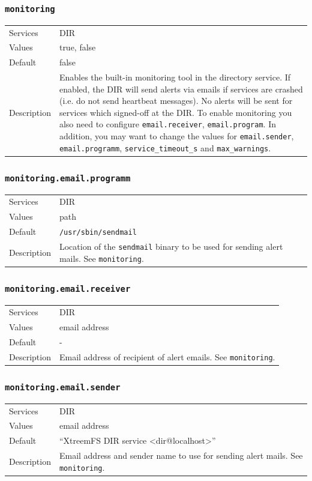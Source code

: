 \documentclass[a4paper,10pt]{book}
\begin{document}
\subsubsection{\texttt{monitoring}}
\begin{tabular}{lp{10cm}}
 Services & DIR\\
 Values   & true, false \\
 Default  & false\\
 Description & Enables the built-in monitoring tool in the directory service. If enabled, the DIR will send alerts via emails if services are crashed (i.e. do not send heartbeat messages). No alerts will be sent for services which signed-off at the DIR. To enable monitoring you also need to configure \texttt{email.receiver}, \texttt{email.program}. In addition, you may want to change the values for \texttt{email.sender}, \texttt{email.programm}, \texttt{service\_timeout\_s} and \texttt{max\_warnings}.
\end{tabular}

\subsubsection{\texttt{monitoring.email.programm}}
\begin{tabular}{lp{10cm}}
 Services & DIR\\
 Values   & path \\
 Default  & \texttt{/usr/sbin/sendmail} \\
 Description & Location of the \texttt{sendmail} binary to be used for sending alert mails. See \texttt{monitoring}.
\end{tabular}

\subsubsection{\texttt{monitoring.email.receiver}}
\begin{tabular}{lp{10cm}}
 Services & DIR\\
 Values   & email address \\
 Default  & - \\
 Description & Email address of recipient of alert emails. See \texttt{monitoring}.
\end{tabular}

\subsubsection{\texttt{monitoring.email.sender}}
\begin{tabular}{lp{10cm}}
 Services & DIR\\
 Values   & email address \\
 Default  & ``XtreemFS DIR service <dir@localhost>''\\
 Description & Email address and sender name to use for sending alert mails. See \texttt{monitoring}.
\end{tabular}
\end{document}
